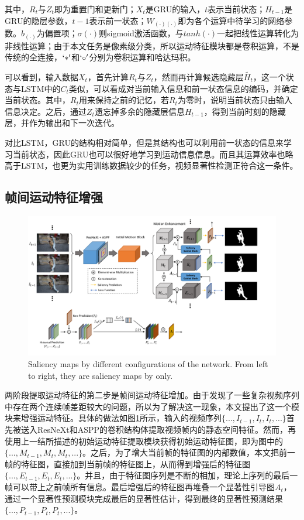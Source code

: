 其中，$R_{t}$与$Z_{t}$即为重置门和更新门；$X_{t}$是GRU的输入，$t$表示当前状态；$H_{t-1}$是GRU的隐层参数，$t-1$表示前一状态；$W_{(\cdot)(\cdot)}$即为各个运算中待学习的网络参数。$b_{(\cdot)}$为偏置项；$\sigma(\cdot)$则sigmoid激活函数，与$tanh(\cdot)$一起把线性运算转化为非线性运算；由于本文任务是像素级分类，所以运动特征模块都是卷积运算，不是传统的全连接，$`*'$和$`\circ'$分别为卷积运算和哈达玛积。

可以看到，输入数据$X_{t}$，首先计算$R_{t}$与$Z_{t}$，然而再计算候选隐藏层$\tilde{H_t}$，这一个状态与LSTM中的$C_t$类似，可以看成对当前输入信息和前一状态信息的编码，并确定当前状态。其中，$R_{t}$用来保持之前的记忆，若$R_{t}$为零时，说明当前状态只由输入信息决定。之后，通过$Z_{t}$遗忘掉多余的隐藏层信息$H_{t-1}$，得到当前时刻的隐藏层，并作为输出和下一次迭代。

对比LSTM，GRU的结构相对简单，但是其结构也可以利用前一状态的信息来学习当前状态，因此GRU也可以很好地学习到运动信息信息。而且其运算效率也略高于LSTM，也更为实用训练数据较少的任务，视频显著性检测正符合这一条件。

\subsection{帧间运动特征增强}

\begin{figure}
\center
\includegraphics[width=1\textwidth]{figures/framework3}
\caption{Saliency maps by different configurations of the network. From left to right, they are saliency maps by only.}
\label{framework3}
\end{figure}

两阶段提取运动特征的第二步是帧间运动特征增加。由于发现了一些复杂视频序列中存在两个连续帧差距较大的问题，所以为了解决这一现象，本文提出了这一个模块来增强运动特征。具体的做法如图\ref{framework3}所示，输入的视频序列$\{..., I_ {t-1}, I_{t}, I_{t}, ...\}$首先被送入ResNeXt和ASPP的卷积结构体提取视频帧内的静态空间特征。然而，再使用上一结所描述的初始运动特征提取模块获得初始运动特征图，即为图中的$\{..., M_{t-1}, M_{t}, M_{t}, ...\}$。之后，为了增大当前帧的特征图的内部数值，本文把前一帧的特征图，直接加到当前帧的特征图上，从而得到增强后的特征图$\{..., E_{t-1}, E_{t}, E_{t}, ...\}$。并且，由于特征图序列是不断的相加，理论上序列的最后一帧可以带上之前帧所有信息。最后增强后的特征图再堆叠一个显著性引导图$A_{t}$，通过一个显著性预测模块完成最后的显著性估计，得到最终的显著性预测结果$\{..., P_{t-1}, P_{t}, P_{t}, ...\}$。


